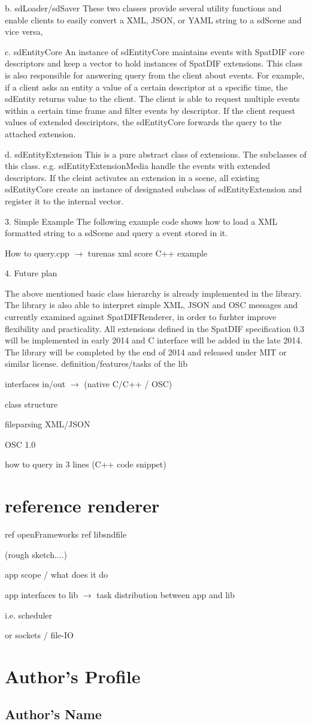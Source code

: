\documentclass{article}
\begin{document}
b. sdLoader/sdSaver
These two classes provide several utility functions and enable clients to easily convert a XML, JSON, or YAML string to a sdScene and vice versa,

c. sdEntityCore
An instance of sdEntityCore maintains events with SpatDIF core descriptors and keep a vector to hold instances of SpatDIF extensions. This class is also responsible for answering query from the client about events. For example, if a client asks an entity a value of a certain descriptor at a specific time, the sdEntity returns value to the client. The client is able to request multiple events within a certain time frame and filter events by descriptor. If the client request values of extended desciriptors, the sdEntityCore forwards the query to the attached extension.

d. sdEntityExtension
This is a pure abstract class of extensions. The subclasses of this class. e.g. sdEntityExtensionMedia handle the events with extended descriptors. If the cleint activates an extension in a scene, all existing sdEntityCore create an instance of designated subclass of sdEntityExtension and register it to the internal vector.

3. Simple Example
The following example code shows how to load a XML formatted string to a sdScene and query a event stored in it.

How to query.cpp
$\rightarrow$ turenas xml score C++ example


4. Future plan

The above mentioned basic class hierarchy is already implemented in the library. The library is also able to interpret simple XML, JSON and OSC messages and currently examined against SpatDIFRenderer, in order to furhter improve flexibility and practicality.  All extensions defined in the SpatDIF specification 0.3 will be implemented in early 2014 and C interface will be added in the late 2014. The library will be completed by the end of 2014 and released under MIT or similar license.
definition/features/tasks of the lib

interfaces in/out $\rightarrow$ (native C/C++ / OSC)

class structure

fileparsing XML/JSON

OSC 1.0

how to query in 3 lines (C++ code snippet)

\section{reference renderer }%


ref openFrameworks
ref libsndfile


(rough sketch....)

app scope / what does it do

app interfaces to lib $\rightarrow$ task distribution between app and lib

i.e. scheduler

or sockets / file-IO

\printbibliography


\section{Author's Profile}

\subsection*{Author's Name}
\end{document}
